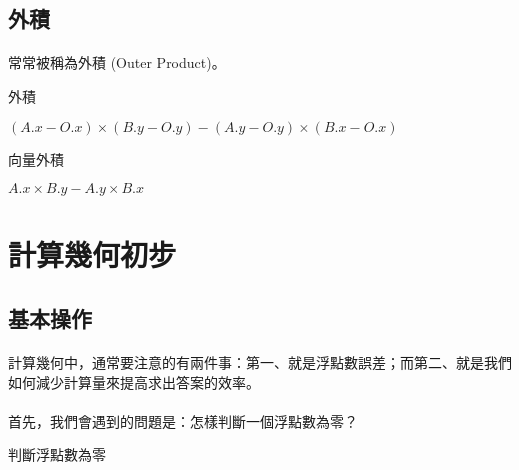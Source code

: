 \documentclass[12pt,a4paper,oneside]{report}
\begin{document}
\begin{CJK}{UTF8}{bkai}
\subsection{外積}
\paragraph{}常常被稱為外積 (Outer Product)。

\begin{algorithm}
\caption{外積}
\label{algo:cross_product}
\begin{algorithmic}
  \State \Return $(A.x-O.x)\times{(B.y-O.y)}-(A.y-O.y)\times{(B.x-O.x)}$
\EndProcedure
\end{algorithmic}
\end{algorithm}
\begin{algorithm}
\caption{向量外積}
\label{algo:cross_product_vector}
\begin{algorithmic}
  \State \Return $A.x\times{B.y}-A.y\times{B.x}$
\EndProcedure
\end{algorithmic}
\end{algorithm}

\section{計算幾何初步}

\subsection{基本操作}
\paragraph{}計算幾何中，通常要注意的有兩件事：第一、就是浮點數誤差；而第二、就是我們如何減少計算量來提高求出答案的效率。
\paragraph{}首先，我們會遇到的問題是：怎樣判斷一個浮點數為零？

\begin{algorithm}
\caption{判斷浮點數為零}
\begin{algorithmic}
    \State \Return \True
  \Else
    \State \Return \False
  \EndIf
\EndProcedure
\end{algorithmic}
\end{algorithm}

\ifx \allfiles \undefined
\printindex[noun]

\clearpage
\end{CJK}
\end{document}
